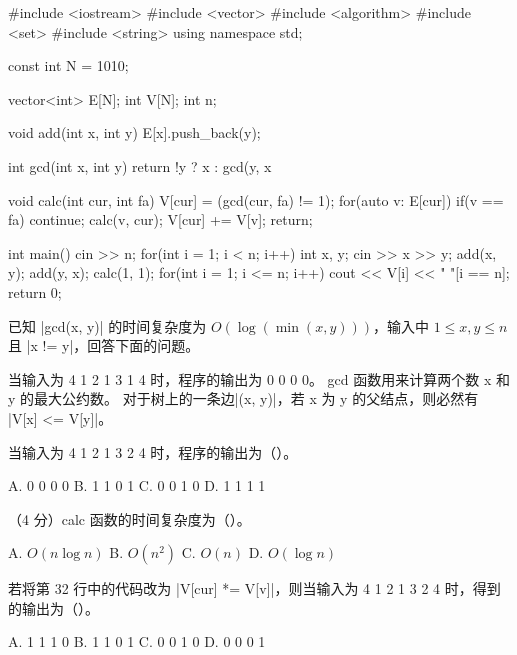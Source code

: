 \documentclass{cspexam}
\begin{document}
\begin{ncode}
#include <iostream>
#include <vector>
#include <algorithm>
#include <set>
#include <string>
using namespace std;

const int N = 1010;

vector<int> E[N];
int V[N];
int n;

void add(int x, int y)
{
    E[x].push_back(y);
}

int gcd(int x, int y)
{
    return !y ? x : gcd(y, x %
}

void calc(int cur, int fa)
{
    V[cur] = (gcd(cur, fa) != 1);
    for(auto v: E[cur])
    {
        if(v == fa)
            continue;
        calc(v, cur);
        V[cur] += V[v];
    }
    return;
}

int main()
{
    cin >> n;
    for(int i = 1; i < n; i++)
    {
        int x, y;
        cin >> x >> y;
        add(x, y);
        add(y, x);
    }
    calc(1, 1);
    for(int i = 1; i <= n; i++)
        cout << V[i] << " \n"[i == n];
    return 0;
}
\end{ncode}

\vspace{0.4em}
\hspace*{\Qindent}已知 \co|gcd(x, y)| 的时间复杂度为 \(O(\log(\min(x,y)))\)，输入中 \(1\le x,y\le n\) 且 \co|x != y|，回答下面的问题。


\Q 当输入为 4 1 2 1 3 1 4 时，程序的输出为 0 0 0 0。\tfend
\Q gcd 函数用来计算两个数 x 和 y 的最大公约数。\tfend
\Q 对于树上的一条边\co|(x, y)|，若 x 为 y 的父结点，则必然有 \co|V[x] <= V[y]|。\tfend


\Q 当输入为 4 1 2 1 3 2 4 时，程序的输出为（\quad）。
\begin{optrow}
\op A. 0 0 0 0 \op B. 1 1 0 1 \op C. 0 0 1 0 \op D. 1 1 1 1
\end{optrow}

\Q （4 分）calc 函数的时间复杂度为（\quad）。
\begin{optrow}
\op A. \(O(n\log n)\) \op B. \(O(n^2)\) \op C. \(O(n)\) \op D. \(O(\log n)\)
\end{optrow}

\Q 若将第 32 行中的代码改为 \co|V[cur] *= V[v]|，则当输入为 4 1 2 1 3 2 4 时，得到的输出为（\quad）。
\begin{optrow}
\op A. 1 1 1 0 \op B. 1 1 0 1 \op C. 0 0 1 0 \op D. 0 0 0 1
\end{optrow}
\end{document}
